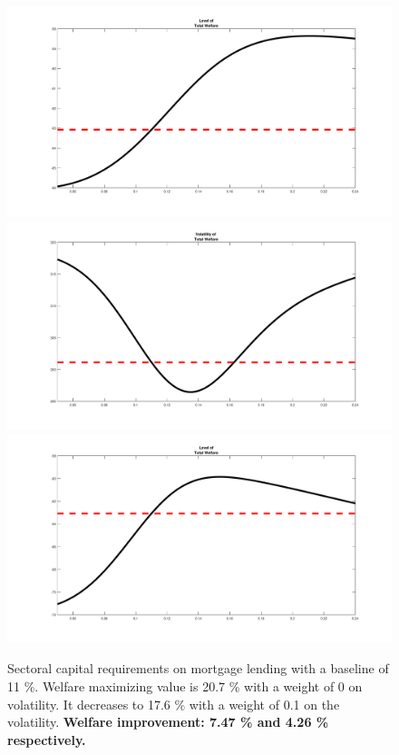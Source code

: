 \documentclass[12pt]{article}
\numberwithin{equation}{section}
\begin{document}
\begin{figure}[H]
\centering
\caption{Sectoral capital requirements on mortgage lending with a baseline of 11 \%. Welfare maximizing value is 20.7 \% with a weight of 0 on volatility. It decreases to 17.6 \% with a weight of 0.1 on the volatility.
\textbf{Welfare improvement: 7.47 \% and 4.26 \% respectively.} } 
\includegraphics[scale=0.2]{welfare_SCR_housing_level.pdf}
\includegraphics[scale=0.2]{welfare_SCR_housing_var.pdf}\\
\includegraphics[scale=0.2]{welfare_CAR_level.pdf}

\end{figure}
\end{document}
